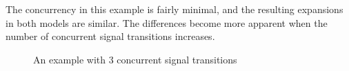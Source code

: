 The concurrency in this example is fairly minimal, and the resulting expansions in both models are
similar. The differences become more apparent when the number of concurrent signal transitions increases. 
 
\begin{figure}[h]
	\centering
\hspace{30mm}
	\caption{\label{fig:concurrency-example} An example with 3 concurrent signal transitions}
\end{figure} 


